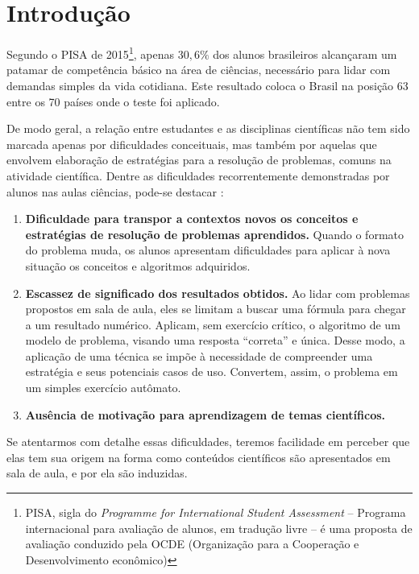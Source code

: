 \chapter*[Introdução]{Introdução}

Segundo o PISA de 2015\footnote{PISA, sigla do \textit{Programme for International Student Assessment} -- Programa internacional para avaliação de alunos, em tradução livre -- é uma proposta de avaliação conduzido pela OCDE (Organização para a Cooperação e Desenvolvimento econômico)}, apenas $30,6\%$ dos alunos brasileiros alcançaram um patamar de competência básico na área de ciências, necessário para lidar com demandas simples da vida cotidiana. Este resultado coloca o Brasil na posição 63 entre os 70 países onde o teste foi aplicado.

De modo geral, a relação entre estudantes e as disciplinas científicas não tem sido marcada apenas por dificuldades conceituais, mas também por aquelas que envolvem elaboração de estratégias para a resolução de problemas, comuns na atividade científica. Dentre as dificuldades recorrentemente demonstradas por alunos nas aulas ciências, pode-se destacar \cite{Pozo}:


\begin{enumerate}
  \item \textbf{Dificuldade para transpor a contextos novos os conceitos e estratégias de resolução de problemas aprendidos.} Quando o formato do problema muda, os alunos apresentam dificuldades para aplicar à nova situação os conceitos e algoritmos adquiridos. 

  \item \textbf{Escassez de significado dos resultados obtidos.} Ao lidar com problemas propostos em sala de aula, eles se limitam a buscar uma fórmula para chegar a um resultado numérico. Aplicam, sem exercício crítico, o algoritmo de um modelo de problema, visando uma resposta ``correta'' e única. Desse modo, a aplicação de uma técnica se impõe à necessidade de compreender uma estratégia e seus potenciais casos de uso. Convertem, assim, o problema em um simples exercício autômato. 
  
  \item \textbf{Ausência de motivação para aprendizagem de temas científicos.}
\end{enumerate}

Se atentarmos com detalhe essas dificuldades, teremos facilidade em perceber que elas tem sua origem na forma como conteúdos científicos são apresentados em sala de aula, e por ela são induzidas.

